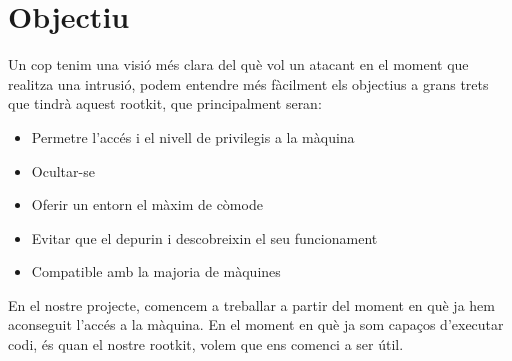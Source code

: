 \section{Objectiu}

Un cop tenim una visió més clara del què vol un atacant en el moment que realitza una intrusió, podem entendre 
més fàcilment els objectius a grans trets que tindrà aquest rootkit, que principalment seran:

\begin{itemize}
    \item Permetre l'accés i el nivell de privilegis a la màquina
    \item Ocultar-se
    \item Oferir un entorn el màxim de còmode
    \item Evitar que el depurin i descobreixin el seu funcionament
    \item Compatible amb la majoria de màquines
\end{itemize}

En el nostre projecte, comencem a treballar a partir del moment en què ja hem aconseguit l'accés a la
màquina. En el moment en què ja som capaços d'executar codi, és quan el nostre rootkit, volem que ens 
comenci a ser útil. \\
